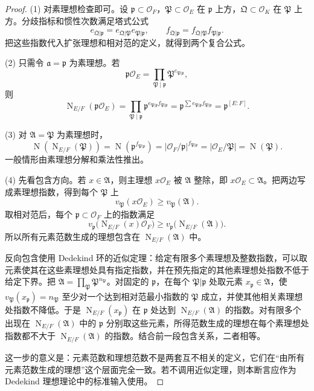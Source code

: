 \documentclass[11pt,a4paper,openany]{ctexbook}
\numberwithin{equation}{chapter}
\newcommand{\OF}{\mathcal{O}_F}
\newcommand{\Nm}{\operatorname{N}}
\theoremstyle{plain}
\theoremstyle{definition}
\theoremstyle{remark}
\begin{document}
\begin{proof}
(1) 对素理想检查即可。设 $\mathfrak p\subset\OF$，$\mathfrak P\subset\mathcal O_E$ 在 $\mathfrak p$ 上方，$\mathfrak Q\subset\mathcal O_K$ 在 $\mathfrak P$ 上方。分歧指标和惯性次数满足塔式公式
\[
e_{\mathfrak Q|\mathfrak p}=e_{\mathfrak Q|\mathfrak P}e_{\mathfrak P|\mathfrak p},
\qquad
f_{\mathfrak Q|\mathfrak p}=f_{\mathfrak Q|\mathfrak P}f_{\mathfrak P|\mathfrak p}.
\]
把这些指数代入扩张理想和相对范的定义，就得到两个复合公式。

(2) 只需令 $\mathfrak a=\mathfrak p$ 为素理想。若
\[
\mathfrak p\mathcal O_E=\prod_{\mathfrak P\mid\mathfrak p}\mathfrak P^{e_{\mathfrak P|\mathfrak p}},
\]
则
\[
\Nm_{E/F}(\mathfrak p\mathcal O_E)
=\prod_{\mathfrak P\mid\mathfrak p}
\mathfrak p^{e_{\mathfrak P|\mathfrak p}f_{\mathfrak P|\mathfrak p}}
=\mathfrak p^{\sum e_{\mathfrak P|\mathfrak p}f_{\mathfrak P|\mathfrak p}}
=\mathfrak p^{[E:F]}.
\]

(3) 对 $\mathfrak A=\mathfrak P$ 为素理想时，
\[
\Nm(\Nm_{E/F}(\mathfrak P))
=\Nm(\mathfrak p^{f_{\mathfrak P|\mathfrak p}})
=|\OF/\mathfrak p|^{f_{\mathfrak P|\mathfrak p}}
=|\mathcal O_E/\mathfrak P|
=\Nm(\mathfrak P).
\]
一般情形由素理想分解和乘法性推出。

(4) 先看包含方向。若 $x\in\mathfrak A$，则主理想 $x\mathcal O_E$ 被 $\mathfrak A$ 整除，即 $x\mathcal O_E\subset\mathfrak A$。把两边写成素理想指数，得到每个 $\mathfrak P$ 上
\[
v_{\mathfrak P}(x\mathcal O_E)\ge v_{\mathfrak P}(\mathfrak A).
\]
取相对范后，每个 $\mathfrak p\subset\OF$ 上的指数满足
\[
v_{\mathfrak p}\bigl(\Nm_{E/F}(x)\mathcal O_F\bigr)
\ge
v_{\mathfrak p}\bigl(\Nm_{E/F}(\mathfrak A)\bigr).
\]
所以所有元素范数生成的理想包含在 $\Nm_{E/F}(\mathfrak A)$ 中。

反向包含使用 Dedekind 环的近似定理：给定有限多个素理想及整数指数，可以取元素使其在这些素理想处具有指定指数，并在预先指定的其他素理想处指数不低于给定下界。把 $\mathfrak A=\prod_{\mathfrak P}\mathfrak P^{n_{\mathfrak P}}$。对固定的 $\mathfrak p$，在每个 $\mathfrak P|\mathfrak p$ 处取元素 $x_{\mathfrak p}\in\mathfrak A$，使 $v_{\mathfrak P}(x_{\mathfrak p})=n_{\mathfrak P}$ 至少对一个达到相对范最小指数的 $\mathfrak P$ 成立，并使其他相关素理想处指数不降低。于是 $\Nm_{E/F}(x_{\mathfrak p})$ 在 $\mathfrak p$ 处达到 $\Nm_{E/F}(\mathfrak A)$ 的指数。对有限多个出现在 $\Nm_{E/F}(\mathfrak A)$ 中的 $\mathfrak p$ 分别取这些元素，所得范数生成的理想在每个素理想处指数都不大于 $\Nm_{E/F}(\mathfrak A)$ 的指数。结合前一段包含关系，二者相等。

这一步的意义是：元素范数和理想范数不是两套互不相关的定义，它们在“由所有元素范数生成的理想”这个层面完全一致。若不调用近似定理，则本断言应作为 Dedekind 理想理论中的标准输入使用。
\end{proof}
\end{document}
